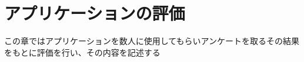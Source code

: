 \documentclass[main]{subfiles}
\begin{document}
\chapter{アプリケーションの評価}
\label{cha:evalidation}
この章ではアプリケーションを数人に使用してもらいアンケートを取るその結果をもとに評価を行い、その内容を記述する
\end{document}
